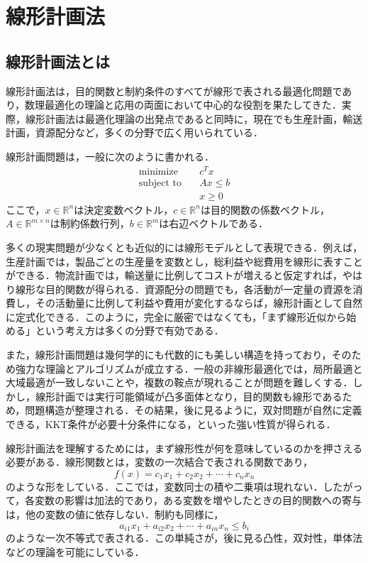 \section{線形計画法}

\subsection{線形計画法とは}

線形計画法は，目的関数と制約条件のすべてが線形で表される最適化問題であり，数理最適化の理論と応用の両面において中心的な役割を果たしてきた．実際，線形計画法は最適化理論の出発点であると同時に，現在でも生産計画，輸送計画，資源配分など，多くの分野で広く用いられている．

線形計画問題は，一般に次のように書かれる．
\begin{align}
\text{minimize}\quad&c^Tx\\
\text{subject to}\quad&Ax\le b\\
&x\ge 0
\end{align}
ここで，$x\in \mathbb{R}^n$は決定変数ベクトル，$c\in \mathbb{R}^n$は目的関数の係数ベクトル，$A\in \mathbb{R}^{m\times n}$は制約係数行列，$b\in \mathbb{R}^m$は右辺ベクトルである．

多くの現実問題が少なくとも近似的には線形モデルとして表現できる．例えば，生産計画では，製品ごとの生産量を変数とし，総利益や総費用を線形に表すことができる．物流計画では，輸送量に比例してコストが増えると仮定すれば，やはり線形な目的関数が得られる．資源配分の問題でも，各活動が一定量の資源を消費し，その活動量に比例して利益や費用が変化するならば，線形計画として自然に定式化できる．このように，完全に厳密ではなくても，「まず線形近似から始める」という考え方は多くの分野で有効である．

また，線形計画問題は幾何学的にも代数的にも美しい構造を持っており，そのため強力な理論とアルゴリズムが成立する．一般の非線形最適化では，局所最適と大域最適が一致しないことや，複数の鞍点が現れることが問題を難しくする．しかし，線形計画では実行可能領域が凸多面体となり，目的関数も線形であるため，問題構造が整理される．その結果，後に見るように，双対問題が自然に定義できる，KKT条件が必要十分条件になる，といった強い性質が得られる．

線形計画法を理解するためには，まず線形性が何を意味しているのかを押さえる必要がある．線形関数とは，変数の一次結合で表される関数であり，
\begin{equation}
f(x)=c_1x_1+c_2x_2+\cdots+c_nx_n
\end{equation}
のような形をしている．ここでは，変数同士の積や二乗項は現れない．したがって，各変数の影響は加法的であり，ある変数を増やしたときの目的関数への寄与は，他の変数の値に依存しない．制約も同様に，
\begin{equation}
a_{i1}x_1+a_{i2}x_2+\cdots+a_{in}x_n\le b_i
\end{equation}
のような一次不等式で表される．この単純さが，後に見る凸性，双対性，単体法などの理論を可能にしている．

